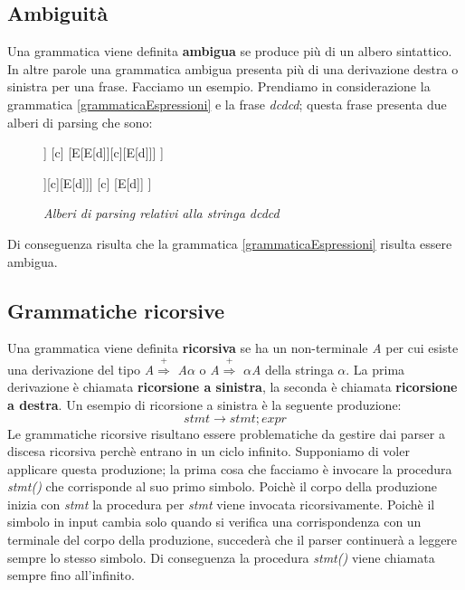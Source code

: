 \subsection{Ambiguità}
Una grammatica viene definita \textbf{ambigua} se produce più di un albero sintattico. In altre parole una grammatica ambigua presenta \cite{libro: compilatori} più di una derivazione destra o sinistra per una frase. Facciamo un esempio. Prendiamo in considerazione la grammatica \ref{grammaticaEspressioni} e la frase \textit{dcdcd}; questa frase presenta due alberi di parsing che sono:\par
\begin{figure}[hbpb]\label{alberibis}
	\centering
	\begin{forest}
	[E
	[E[d]]
	[c]
	[E[E[d]][c][E[d]]]
	]
	\end{forest}
	\begin{forest}
	[E
	[E[E[d]][c][E[d]]]
	[c]
	[E[d]]
	]
	\end{forest}
	\caption{\textit{Alberi di parsing relativi alla stringa dcdcd}}
\end{figure}
\noindent Di conseguenza risulta che la grammatica \ref{grammaticaEspressioni} risulta essere ambigua.
\subsection{Grammatiche ricorsive}\label{par:ric}
Una grammatica viene definita \textbf{ricorsiva} \cite{libro: compilatori} se ha un non-terminale \textit{A} per cui esiste una derivazione del tipo \textit{A}$\overset{+}{\Rightarrow}$ \textit{A}$\alpha$ o \textit{A}$\overset{+}{\Rightarrow}$ $\alpha$\textit{A} della stringa $\alpha$. La prima derivazione è chiamata \textbf{ricorsione a sinistra}, la seconda è chiamata \textbf{ricorsione a destra}. Un esempio di ricorsione a sinistra è la seguente produzione:
\[
	stmt \to stmt; expr
\]
Le grammatiche ricorsive risultano essere problematiche da gestire dai parser a discesa ricorsiva perchè entrano in un ciclo infinito. Supponiamo di voler applicare questa produzione; la prima cosa che facciamo è invocare la procedura \textit{stmt()} che corrisponde al suo primo simbolo. Poichè il corpo della produzione inizia con \textit{stmt} la procedura per \textit{stmt} viene invocata ricorsivamente. Poichè il simbolo in input cambia solo quando si verifica una corrispondenza con un terminale del corpo della produzione, succederà che il parser continuerà a leggere sempre lo stesso simbolo. Di conseguenza la procedura \textit{stmt()} viene chiamata sempre fino all'infinito.
